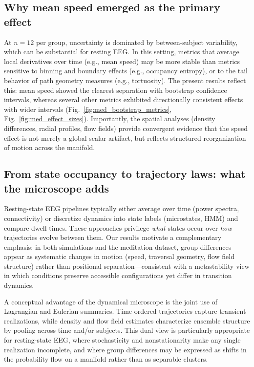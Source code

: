 \documentclass[5p,twocolumn,authoryear]{elsarticle}
\newcommand{\figref}[1]{Fig.~\ref{#1}}
\begin{document}
\subsection{Why mean speed emerged as the primary effect}
At $n=12$ per group, uncertainty is dominated by between-subject variability, which can be substantial for resting EEG. In this setting, metrics that average local derivatives over time (e.g., mean speed) may be more stable than metrics sensitive to binning and boundary effects (e.g., occupancy entropy), or to the tail behavior of path geometry measures (e.g., tortuosity). The present results reflect this: mean speed showed the clearest separation with bootstrap confidence intervals, whereas several other metrics exhibited directionally consistent effects with wider intervals (\figref{fig:med_bootstrap_metrics}, \figref{fig:med_effect_sizes}). Importantly, the spatial analyses (density differences, radial profiles, flow fields) provide convergent evidence that the speed effect is not merely a global scalar artifact, but reflects structured reorganization of motion across the manifold.

\subsection{From state occupancy to trajectory laws: what the microscope adds}
Resting-state EEG pipelines typically either average over time (power spectra, connectivity) or discretize dynamics into state labels (microstates, HMM) and compare dwell times. These approaches privilege \emph{what} states occur over \emph{how} trajectories evolve between them. Our results motivate a complementary emphasis: in both simulations and the meditation dataset, group differences appear as systematic changes in motion (speed, traversal geometry, flow field structure) rather than positional separation---consistent with a metastability view in which conditions preserve accessible configurations yet differ in transition dynamics.

A conceptual advantage of the dynamical microscope is the joint use of Lagrangian and Eulerian summaries. Time-ordered trajectories capture transient realizations, while density and flow field estimates characterize ensemble structure by pooling across time and/or subjects. This dual view is particularly appropriate for resting-state EEG, where stochasticity and nonstationarity make any single realization incomplete, and where group differences may be expressed as shifts in the probability flow on a manifold rather than as separable clusters.
\end{document}
